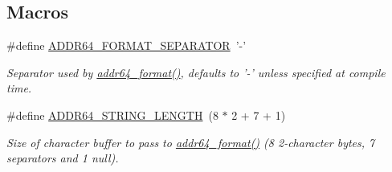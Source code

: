 \subsection*{Macros}
\begin{DoxyCompactItemize}
\item 
\#define \hyperlink{group__wpan__types_ga806a2554dd5d8a154d23b13b9cf72141}{A\-D\-D\-R64\-\_\-\-F\-O\-R\-M\-A\-T\-\_\-\-S\-E\-P\-A\-R\-A\-T\-O\-R}~'-\/'
\begin{DoxyCompactList}\small\item\em Separator used by \hyperlink{group__wpan__types_ga448782f4aed0821758969b47221417ed}{addr64\-\_\-format()}, defaults to '-\/' unless specified at compile time. \end{DoxyCompactList}\item 
\#define \hyperlink{group__wpan__types_gac468b40b060897498f923923654c3d4a}{A\-D\-D\-R64\-\_\-\-S\-T\-R\-I\-N\-G\-\_\-\-L\-E\-N\-G\-T\-H}~(8 $\ast$ 2 + 7 + 1)
\begin{DoxyCompactList}\small\item\em Size of character buffer to pass to \hyperlink{group__wpan__types_ga448782f4aed0821758969b47221417ed}{addr64\-\_\-format()} (8 2-\/character bytes, 7 separators and 1 null). \end{DoxyCompactList}\end{DoxyCompactItemize}

